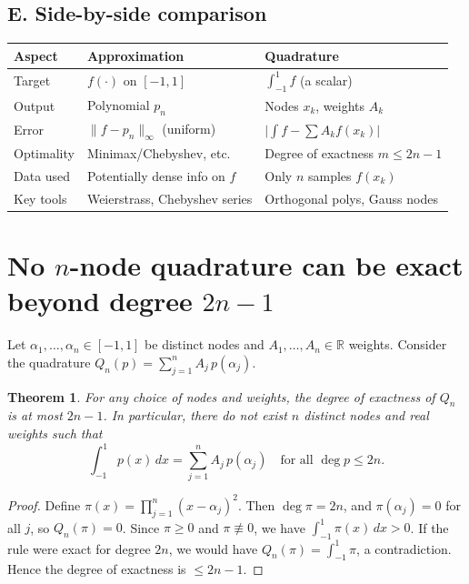 \documentclass[11pt,a4paper]{article}
\newtheorem{theorem}{Theorem}
\theoremstyle{definition}
\theoremstyle{definition}
\theoremstyle{plain}
\theoremstyle{remark}
\begin{document}
\subsection*{E. Side-by-side comparison}
\begin{center}
	\begin{tabular}{|l|l|l|}
		\hline
		\textbf{Aspect} & \textbf{Approximation} & \textbf{Quadrature} \\
		\hline
		Target & \(f(\cdot)\) on \([-1,1]\) & \(\displaystyle \int_{-1}^{1} f\) (a scalar) \\
		\hline
		Output & Polynomial \(p_n\) & Nodes \(x_k\), weights \(A_k\) \\
		\hline
		Error & \(\|f-p_n\|_\infty\) (uniform) & \(\bigl|\int f-\sum A_k f(x_k)\bigr|\) \\
		\hline
		Optimality & Minimax/Chebyshev, etc. & Degree of exactness \(m\le 2n-1\) \\
		\hline
		Data used & Potentially dense info on \(f\) & Only \(n\) samples \(f(x_k)\) \\
		\hline
		Key tools & Weierstrass, Chebyshev series & Orthogonal polys, Gauss nodes \\
		\hline
	\end{tabular}
\end{center}

\section*{No $n$-node quadrature can be exact beyond degree $2n-1$}

Let $\alpha_1,\dots,\alpha_n\in[-1,1]$ be distinct nodes and $A_1,\dots,A_n\in\mathbb R$ weights.
Consider the quadrature $Q_n(p)=\sum_{j=1}^n A_j\,p(\alpha_j)$.

\begin{theorem}
	For any choice of nodes and weights, the degree of exactness of $Q_n$ is at most $2n-1$.
	In particular, there do not exist $n$ distinct nodes and real weights such that
	\[
	\int_{-1}^{1} p(x)\,dx=\sum_{j=1}^n A_j\,p(\alpha_j)
	\quad\text{for all } \deg p\le 2n .
	\]
\end{theorem}

\begin{proof}
	Define $\displaystyle \pi(x)=\prod_{j=1}^n (x-\alpha_j)^2$. Then $\deg\pi=2n$, and $\pi(\alpha_j)=0$ for all $j$,
	so $Q_n(\pi)=0$. Since $\pi\ge 0$ and $\pi\not\equiv 0$, we have $\int_{-1}^1 \pi(x)\,dx>0$.
	If the rule were exact for degree $2n$, we would have $Q_n(\pi)=\int_{-1}^1 \pi$, a contradiction.
	Hence the degree of exactness is $\le 2n-1$.
\end{proof}
\end{document}
